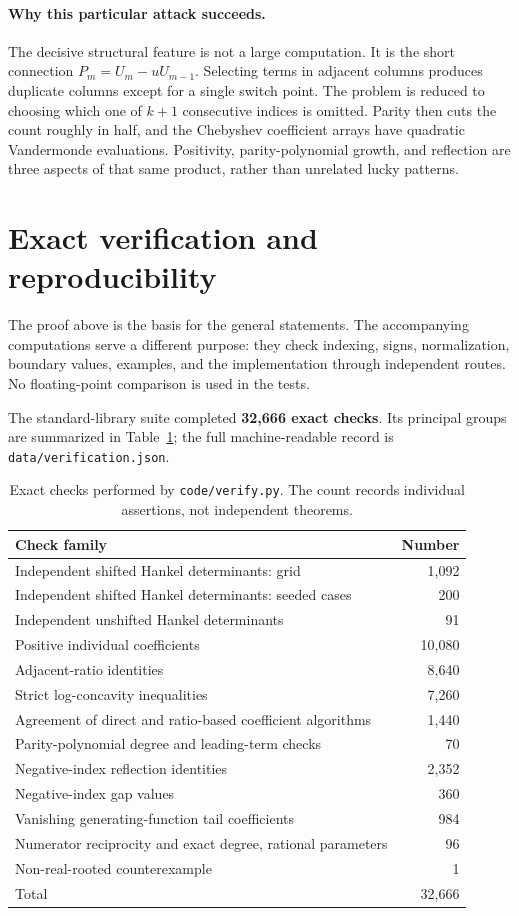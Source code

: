 \documentclass[11pt,letterpaper]{article}
\numberwithin{equation}{section}
\theoremstyle{definition}
\begin{document}
\paragraph{Why this particular attack succeeds.}
The decisive structural feature is not a large computation. It is the
short connection \(P_m=U_m-uU_{m-1}\). Selecting terms in adjacent
columns produces duplicate columns except for a single switch point.
The problem is reduced to choosing which one of \(k+1\) consecutive
indices is omitted. Parity then cuts the count roughly in half, and the
Chebyshev coefficient arrays have quadratic Vandermonde evaluations.
Positivity, parity-polynomial growth, and reflection are three aspects
of that same product, rather than unrelated lucky patterns.

\section{Exact verification and reproducibility}\label{sec:verification}
The proof above is the basis for the general statements. The accompanying
computations serve a different purpose: they check indexing, signs,
normalization, boundary values, examples, and the implementation through
independent routes. No floating-point comparison is used in the tests.

The standard-library suite completed \textbf{32,666 exact checks}.
Its principal groups are summarized in Table~\ref{tab:checks}; the full
machine-readable record is \texttt{data/verification.json}.
\begin{table}[htbp]
\centering
\small
\begin{tabular}{@{}p{}r@{}}
\toprule
Check family & Number\\
\midrule
Independent shifted Hankel determinants: grid & 1,092\\
Independent shifted Hankel determinants: seeded cases & 200\\
Independent unshifted Hankel determinants & 91\\
Positive individual coefficients & 10,080\\
Adjacent-ratio identities & 8,640\\
Strict log-concavity inequalities & 7,260\\
Agreement of direct and ratio-based coefficient algorithms & 1,440\\
Parity-polynomial degree and leading-term checks & 70\\
Negative-index reflection identities & 2,352\\
Negative-index gap values & 360\\
Vanishing generating-function tail coefficients & 984\\
Numerator reciprocity and exact degree, rational parameters & 96\\
Non-real-rooted counterexample & 1\\
\midrule
Total & 32,666\\
\bottomrule
\end{tabular}
\caption{Exact checks performed by \texttt{code/verify.py}. The count
records individual assertions, not independent theorems.}\label{tab:checks}
\end{table}
\end{document}
